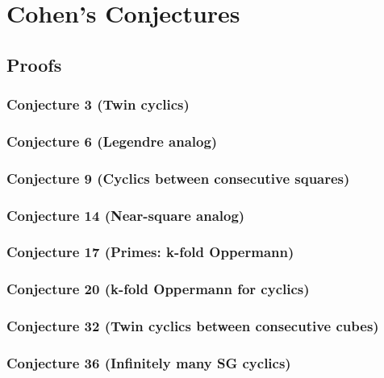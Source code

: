 \documentclass[12pt]{article}
\theoremstyle{remark}
\begin{document}
\section{Cohen's Conjectures}

\subsection{Proofs}

\subsubsection{Conjecture 3 (Twin cyclics)}


\subsubsection{Conjecture 6 (Legendre analog)}


\subsubsection{Conjecture 9 (Cyclics between consecutive squares)}


\subsubsection{Conjecture 14 (Near-square analog)}


\subsubsection{Conjecture 17 (Primes: k-fold Oppermann)}


\subsubsection{Conjecture 20 (k-fold Oppermann for cyclics)}


\subsubsection{Conjecture 32 (Twin cyclics between consecutive cubes)}


\subsubsection{Conjecture 36 (Infinitely many SG cyclics)}

\end{document}
